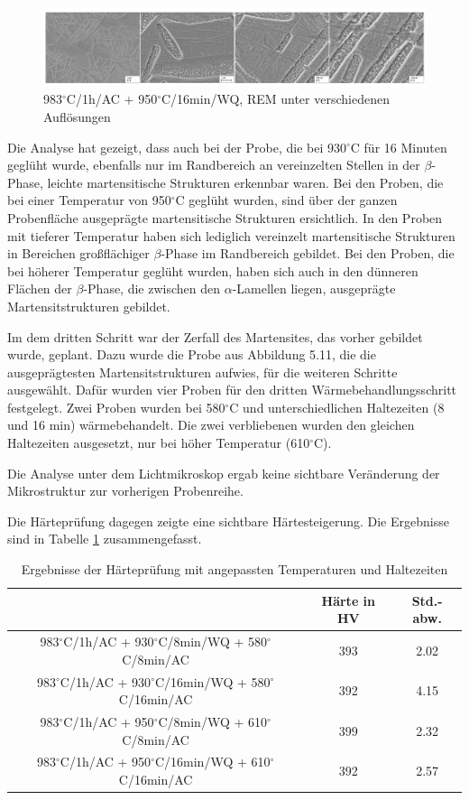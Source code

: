 \begin{figure}[!]
	\centering
	\includegraphics[width=0.9\linewidth]{./Bilder/Abbildung 18}
	\caption[Abbildung 18]{983$^\circ$C/1h/AC + 950$^\circ$C/16min/WQ, REM unter verschiedenen Auflösungen}
	\label{fig:abbildung-18}
\end{figure}

Die Analyse hat gezeigt, dass auch bei der Probe, die bei 930$^\circ$C für 16 Minuten geglüht wurde, ebenfalls nur im Randbereich an vereinzelten Stellen in der $\beta$-Phase, leichte martensitische Strukturen erkennbar waren.
Bei den Proben, die bei einer Temperatur von 950$^\circ$C geglüht wurden, sind über der ganzen Probenfläche ausgeprägte martensitische Strukturen ersichtlich. In den Proben mit tieferer Temperatur haben sich lediglich vereinzelt martensitische Strukturen in Bereichen großflächiger $\beta$-Phase im Randbereich gebildet. Bei den Proben, die bei höherer Temperatur geglüht wurden, haben sich auch in den dünneren Flächen der $\beta$-Phase, die zwischen den $\alpha$-Lamellen liegen, ausgeprägte Martensitstrukturen gebildet.

Im dem dritten Schritt war der Zerfall des Martensites, das vorher gebildet wurde, geplant. Dazu wurde die Probe aus Abbildung 5.11, die die ausgeprägtesten Martensitstrukturen aufwies, für die weiteren Schritte ausgewählt. 
Dafür wurden vier Proben für den dritten Wärmebehandlungsschritt festgelegt. Zwei Proben wurden bei 580$^\circ$C und unterschiedlichen Haltezeiten (8 und 16 min) wärmebehandelt. Die zwei verbliebenen wurden den gleichen Haltezeiten ausgesetzt, nur bei höher Temperatur (610$^\circ$C).

Die Analyse unter dem Lichtmikroskop ergab keine sichtbare Veränderung der Mikrostruktur zur vorherigen Probenreihe.

Die Härteprüfung dagegen zeigte eine sichtbare Härtesteigerung. Die Ergebnisse sind in Tabelle \ref{Tabelle 8} zusammengefasst.

\begin{table}[h]
	\centering
	\begin{tabular}{|c|c|c|}
		\hline 
		& Härte in HV &  Std.-abw. \\ 
		\hline 
		983$^\circ$C/1h/AC + 930$^\circ$C/8min/WQ + 580$^\circ$C/8min/AC & 393 & 2.02 \\ 
		\hline 
		983$^\circ$C/1h/AC + 930$^\circ$C/16min/WQ + 580$^\circ$C/16min/AC & 392 & 4.15 \\ 
		\hline 
		983$^\circ$C/1h/AC + 950$^\circ$C/8min/WQ + 610$^\circ$C/8min/AC & 399 & 2.32 \\ 
		\hline 
		983$^\circ$C/1h/AC + 950$^\circ$C/16min/WQ + 610$^\circ$C/16min/AC & 392 & 2.57 \\ 
		\hline 
	\end{tabular} 
	\caption{Ergebnisse der Härteprüfung mit angepassten Temperaturen und Haltezeiten}
	\label{Tabelle 8}
\end{table}

